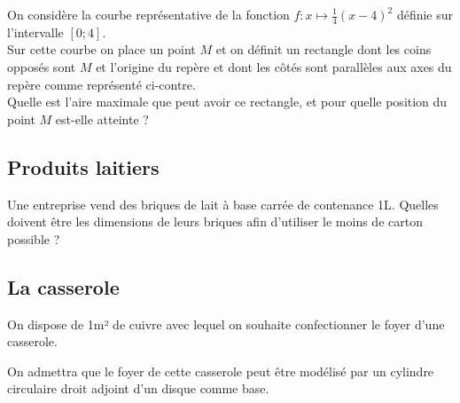 \documentclass[oneside,12pt]{article}          %
\begin{document}
\begin{minipage}{0.5\linewidth}
On considère la courbe représentative de la fonction $f:x\mapsto\frac{1}{4}(x-4)^2$ définie sur l'intervalle $[0;4]$.\\

Sur cette courbe on place un point $M$ et on définit un rectangle dont les coins opposés sont $M$ et l'origine du repère et dont les côtés sont parallèles aux axes du repère comme représenté ci-contre.\\

Quelle est l'aire maximale que peut avoir ce rectangle, et pour quelle position du point $M$ est-elle atteinte ?
\end{minipage}
\begin{minipage}{0.5\linewidth}
\end{minipage}



\subsection{Produits laitiers}
Une entreprise vend des briques de lait à base carrée de contenance 1L. Quelles doivent être les dimensions de leurs briques afin d'utiliser le moins de carton possible ?



\subsection{La casserole}
On dispose de 1m² de cuivre avec lequel on souhaite confectionner le foyer d'une casserole.

On admettra que le foyer de cette casserole peut être modélisé par un cylindre circulaire droit adjoint d'un disque comme base.
\end{document}

